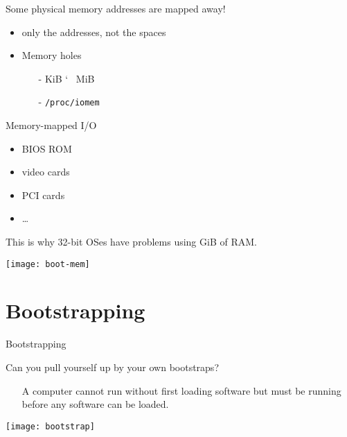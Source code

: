 \begin{frame}[plain]
  \begin{minipage}{.55\linewidth}
    \begin{block}{Some physical memory addresses are mapped away!}
      \begin{itemize}
      \item only the addresses, not the spaces
      \item Memory holes
        \begin{itemize}
        \item[-] \unit[640]{KiB} \char`~ \unit[1]{MiB}
        \item[-] \texttt{/proc/iomem}
        \end{itemize}
      \end{itemize}
    \end{block}
    \begin{block}{Memory-mapped I/O}
      \begin{itemize}
      \item BIOS ROM
      \item video cards
      \item PCI cards
      \item \ldots
      \end{itemize}
      This is why 32-bit OSes have problems using \unit[4]{GiB} of RAM.
    \end{block}
  \end{minipage}\quad
  \begin{minipage}{.35\linewidth}
    \texttt{[image: boot-mem]}
  \end{minipage}
\end{frame}

\section{Bootstrapping}
\label{sec:bootstrapping}

\begin{frame}{Bootstrapping}
  \begin{minipage}{.85\linewidth}
    \begin{block}{Can you pull yourself up by your own bootstraps?}
      \begin{itemize}
      \item[] A computer cannot run without first loading software but must be running
        before any software can be loaded.
      \end{itemize}
    \end{block}
  \end{minipage}\hfill
  \begin{minipage}{.1\linewidth}
    \texttt{[image: bootstrap]}
  \end{minipage}
    \begin{center}
  \end{center}
\end{frame}

